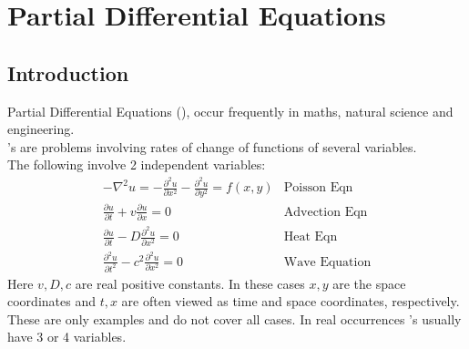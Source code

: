 \chapter{Partial Differential Equations}
\section{Introduction}
Partial Differential Equations (), occur frequently in maths, natural science
and engineering.\\
's are problems involving rates of change of functions of several variables.\\
The following involve 2 independent variables:
\begin{eqnarray*}
-\nabla^2u=-\frac{\partial^2u}{\partial x^2}-\frac{\partial^2u}{\partial y^2}=f(x,y)&\mbox{Poisson Eqn}\\
\frac{\partial u}{\partial t}+v\frac{\partial u}{\partial x}=0&\mbox{Advection Eqn}\\
\frac{\partial u}{\partial t}-D\frac{\partial^2 u}{\partial x^2}=0&\mbox{Heat Eqn}\\
\frac{\partial^2 u}{\partial t^2}-c^2\frac{\partial^2 u}{\partial x^2}=0&\mbox{Wave Equation}
\end{eqnarray*}
Here $v,D,c$ are real positive constants.  In these cases $x,y$ are the space
coordinates and $t,x$ are often viewed as time and space coordinates, respectively.\\
These are only examples and do not cover all cases.  In real occurrences 's
usually have 3 or 4 variables.\\

